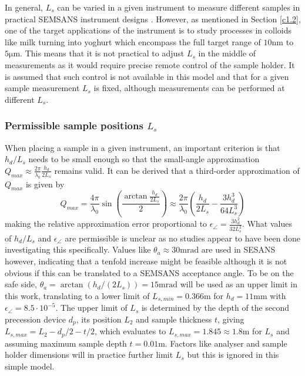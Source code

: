 \documentclass{article}
\begin{document}
In general, $L_s$ can be varied in a given instrument to measure different samples in practical SEMSANS instrument designs \cite{kusmin2017}. However, as mentioned in Section \ref{c1.2}, one of the target applications of the instrument is to study processes in colloids like milk turning into yoghurt which encompass the full target range of $10 \unit{\nano\meter}$ to $5 \unit{\micro\meter}$. This means that it is not practical to adjust $L_s$ in the middle of measurements as it would require precise remote control of the sample holder. It is assumed that such control is not available in this model and that for a given sample measurement $L_s$ is fixed, although measurements can be performed at different $L_s$.  

\subsubsection{Permissible sample positions $L_s$}
When placing a sample in a given instrument, an important criterion is that $h_d/L_s$ needs to be small enough so that the small-angle approximation $Q_{max} \approx \frac{2\pi}{\lambda_0}\frac{h_d}{2L_s}$ remains valid. It can be derived that a third-order approximation of $Q_{max}$ is given by
$$Q_{max} = \frac{4\pi}{\lambda_0}\sin(\frac{\arctan\frac{h_d}{2L_s}}{2}) \approx  \frac{2\pi}{\lambda_0}(\frac{h_d}{2L_s} - \frac{3h_d^3}{64L_s^3})$$
making the relative approximation error proportional to $\epsilon_\angle = \frac{3h_d^2}{32L_s^2}$. What values of $h_d/L_s$ and $\epsilon_\angle$ are permissible is unclear as no studies appear to have been done investigating this specifically. Values like $\theta_a \approx 30\unit{\milli\radian}$ are used in SESANS \cite{rekveldt1996} however, indicating that a tenfold increase might be feasible although it is not obvious if this can be translated to a SEMSANS acceptance angle. To be on the safe side, $\theta_a = \arctan\left(h_d / (2L_s)\right) = 15\unit{\milli\radian}$ will be used as an upper limit in this work, translating to a lower limit of $L_{s,min} = 0.366\unit{\meter}$ for $h_d = 11\unit{\milli\meter}$ with $\epsilon_\angle = 8.5 \cdot 10^{-5}$. 
The upper limit of $L_s$ is determined by the depth of the second precession device $d_p$, its position $L_2$ and sample thickness $t$, giving $L_{s,max} = L_2 - d_p / 2 - t/2$, which evaluates to $L_{s,max} = 1.845 \approx 1.8\unit\meter$ for $L_s$ and assuming maximum sample depth $t=0.01\unit\meter$. Factors like analyser and sample holder dimensions will in practice further limit $L_s$ but this is ignored in this simple model.
\end{document}
